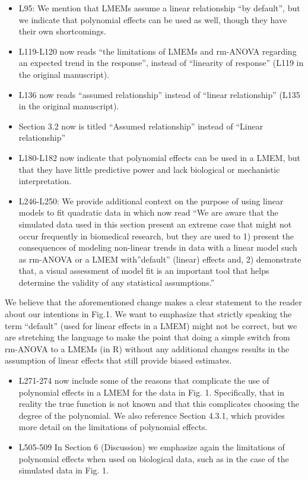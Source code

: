 \documentclass[
]{article}
\begin{document}
\begin{itemize}
\item
  L95: We mention that LMEMs assume a linear relationship ``by default'', but we indicate that polynomial effects can be used as well, though they have their own shortcomings.
\item
  L119-L120 now reads ``the limitations of LMEMs and rm-ANOVA regarding an expected trend in the response'', instead of ``linearity of response'' (L119 in the original manuscript).
\item
  L136 now reads ``assumed relationship'' instead of ``linear relationship'' (L135 in the original manuscript).
\item
  Section 3.2 now is titled ``Assumed relationship'' instead of ``Linear relationship''
\item
  L180-L182 now indicate that polynomial effects can be used in a LMEM, but that they have little predictive power and lack biological or mechanistic interpretation.
\item
  L246-L250: We provide additional context on the purpose of using linear models to fit quadratic data in which now read ``We are aware that the simulated data used in this section present an extreme case that might not occur frequently in biomedical research, but they are used to 1) present the consequences of modeling non-linear trends in data with a linear model such as rm-ANOVA or a LMEM with''default'' (linear) effects and, 2) demonstrate that, a visual assessment of model fit is an important tool that helps determine the validity of any statistical assumptions.''
\end{itemize}

We believe that the aforementioned change makes a clear statement to the reader about our intentions in Fig.1. We want to emphasize that strictly speaking the term ``default'' (used for linear effects in a LMEM) might not be correct, but we are stretching the language to make the point that doing a simple switch from rm-ANOVA to a LMEMs (in R) without any additional changes results in the assumption of linear effects that still provide biased estimates.

\begin{itemize}
\item
  L271-274 now include some of the reasons that complicate the use of polynomial effects in a LMEM for the data in Fig. 1. Specifically, that in reality the true function is not known and that this complicates choosing the degree of the polynomial. We also reference Section 4.3.1, which provides more detail on the limitations of polynomial effects.
\item
  L505-509 In Section 6 (Discussion) we emphasize again the limitations of polynomial effects when used on biological data, such as in the case of the simulated data in Fig. 1.
\end{itemize}
\end{document}
